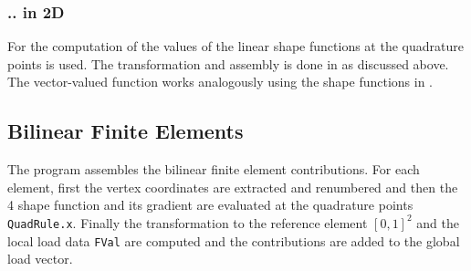 

\subsubsection{.. in 2D}

 For the computation of the values of the linear shape functions at the quadrature points  is used. The transformation and assembly is done in  as discussed above. \\


 The vector-valued function  works analogously using the shape functions in . %



\subsection{Bilinear Finite Elements} 

 The program  assembles the bilinear finite element contributions. For each element, first the vertex coordinates are extracted and renumbered and then the 4 shape function  and its gradient  are evaluated at the quadrature points {\tt QuadRule.x}. Finally the transformation to the reference element $[0,1]^2$ and the local load data {\tt FVal} are computed and the contributions are added to the global load vector.



